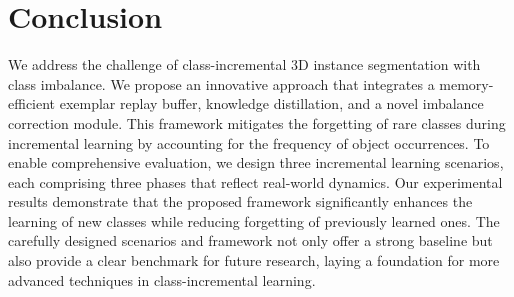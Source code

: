 \section{Conclusion}
We address the challenge of class-incremental 3D instance segmentation with class imbalance. We propose an innovative approach that integrates a memory-efficient exemplar replay buffer, knowledge distillation, and a novel imbalance correction module. This framework mitigates the forgetting of rare classes during incremental learning by accounting for the frequency of object occurrences. To enable comprehensive evaluation, we design three incremental learning scenarios, each comprising three phases that reflect real-world dynamics.
% 
Our experimental results demonstrate that the proposed framework significantly enhances the learning of new classes while reducing forgetting of previously learned ones. The carefully designed scenarios and framework not only offer a strong baseline but also provide a clear benchmark for future research, laying a foundation for more advanced techniques in class-incremental learning.